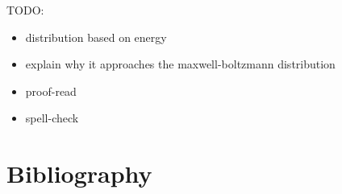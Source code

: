 \newpage
TODO:
\begin{itemize}
\item distribution based on energy
\item explain why it approaches the maxwell-boltzmann distribution
\item proof-read
\item spell-check
\end{itemize}


\newpage
\section*{Bibliography}
\printbibliography[heading=none, keyword={secondary}]


